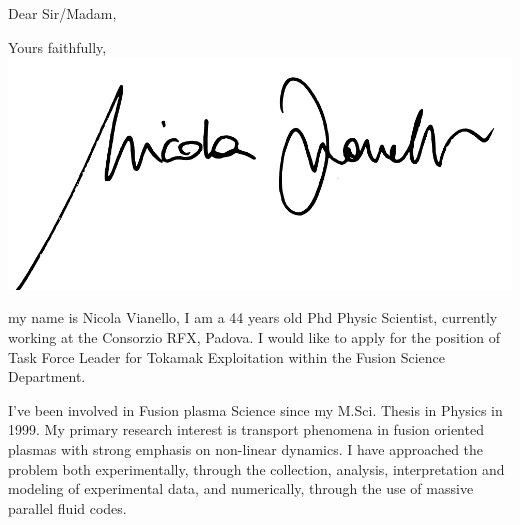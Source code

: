 \documentclass[12pt,a4paper,sans]{moderncv}        %
\begin{document}
\date{June 12, 2020}
\opening{Dear Sir/Madam,}
\closing{Yours faithfully, \\
  \vspace{2pt}
  \includegraphics[height=4\baselineskip]{signature.pdf}}
\makelettertitle
\justify
my name is Nicola Vianello, I am a 44 years old Phd Physic Scientist,
currently working at the Consorzio RFX, Padova. I would like to apply for
the position of Task Force Leader for Tokamak Exploitation within the Fusion Science
Department. 

I've been involved in Fusion plasma Science since my M.Sci. Thesis in
Physics in 1999. My primary research interest is transport phenomena in fusion
oriented plasmas with strong emphasis on non-linear dynamics. I have
approached the problem both experimentally, through the collection, 
analysis, interpretation and modeling of experimental data, and
numerically, through the use of massive parallel fluid codes. 
\end{document}
